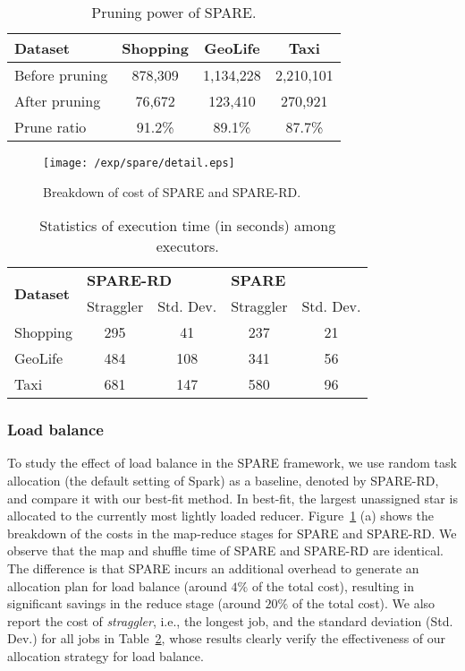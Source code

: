\begin{table}[h]
\centering
\begin{tabular}{|l|c|c|c|}
\hline 
\textbf{Dataset} & \textbf{Shopping} & \textbf{GeoLife} & \textbf{Taxi} \\ 
\hline 
Before pruning & 878,309 &  1,134,228 & 2,210,101 \\ 
\hline 
After pruning & 76,672 & 123,410 & 270,921 \\ 
\hline 
Prune ratio & 91.2\% & 89.1\% & 87.7\% \\ 
\hline 
\end{tabular} 

\caption{Pruning power of SPARE.}
\label{tbl:pruning}
\end{table}

\begin{figure}[h]
\centering
	  \texttt{[image: /exp/spare/detail.eps]}
    \caption{Breakdown of cost of SPARE and SPARE-RD.}
    \label{exp:wl}
\end{figure}

\begin{table}[h]
\centering \small
\begin{tabular}{|l|c|c|c|c|}
\hline
\multirow{2}{*}{\textbf{Dataset}} & \multicolumn{2}{l|}{\textbf{SPARE-RD}} & \multicolumn{2}{l|}{\textbf{SPARE}} \\ \cline{2-5} 
                         & Straggler        & Std. Dev.     & Straggler       & Std. Dev.      \\ \hline
Shopping                 & 295              & 41         & 237             & 21       \\ \hline
GeoLife                  & 484              & 108        & 341             & 56       \\ \hline
Taxi                     & 681              & 147        & 580             & 96       \\ \hline
\end{tabular}
  \caption{Statistics of execution time (in seconds) among executors.}
  \label{tbl:strags}
\end{table}

\subsubsection{Load balance}
To study the effect of load balance in the SPARE framework, we use random task allocation (the default setting of Spark) as a baseline, denoted by SPARE-RD, and compare it with our best-fit method. In best-fit, the largest unassigned star is allocated to the currently most lightly loaded reducer.
Figure~\ref{exp:wl} (a) shows the breakdown of the costs in the map-reduce stages for SPARE and SPARE-RD. We observe that the map and shuffle time of SPARE and SPARE-RD are identical. The difference is that SPARE incurs an additional overhead to generate an allocation plan for load balance (around $4\%$ of the total cost), resulting in significant savings in the reduce stage (around $20\%$ of the total cost). We also report the cost of \emph{straggler}, i.e., the longest job, and the standard deviation (Std. Dev.) for all jobs in Table~\ref{tbl:strags}, whose results clearly verify the effectiveness of our allocation strategy for load balance.


